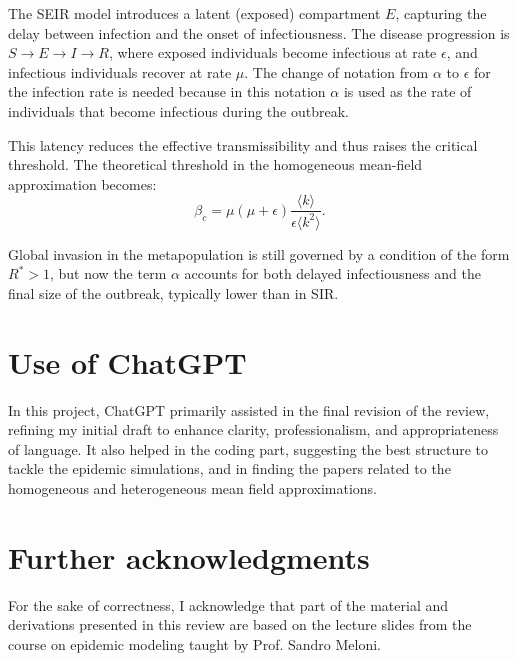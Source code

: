 The SEIR model introduces a latent (exposed) compartment \( E \), capturing the delay between infection and the onset of infectiousness. The disease progression is \( S \to E \to I \to R \), where exposed individuals become infectious at rate \( \epsilon \), and infectious individuals recover at rate \( \mu \). The change of notation from $\alpha$ to $\epsilon$ for the infection rate is needed because in this notation $\alpha$ is used as the rate of individuals that become infectious during the outbreak.

This latency reduces the effective transmissibility and thus raises the critical threshold. The theoretical threshold in the homogeneous mean-field approximation becomes:
\[
\beta_c = \mu(\mu + \epsilon) \frac{\langle k \rangle}{\epsilon \langle k^2 \rangle}.
\]

Global invasion in the metapopulation is still governed by a condition of the form \( R^* > 1 \), but now the term \( \alpha \) accounts for both delayed infectiousness and the final size of the outbreak, typically lower than in SIR.



\label{app:metapopulations}
\section{Use of ChatGPT}

In this project, ChatGPT \cite{OpenAI2025} primarily assisted in the final revision of the review, refining my initial draft to enhance clarity, professionalism, and appropriateness of language.
It also helped in the coding part, suggesting the best structure to tackle the epidemic simulations, and in finding the papers related to the homogeneous and heterogeneous mean field approximations.

\section{Further acknowledgments}
For the sake of correctness, I acknowledge that part of the material and derivations presented in this review are based on the lecture slides from the course on epidemic modeling taught by Prof. Sandro Meloni.
